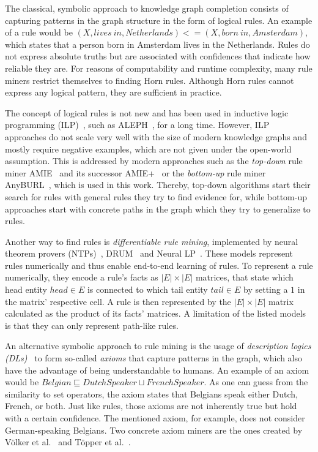 The classical, symbolic approach to knowledge graph completion consists of capturing patterns in the graph structure in the form of logical rules. An example of a rule would be $(X, lives~in, Netherlands) <= (X, born~in, Amsterdam)$, which states that a person born in Amsterdam lives in the Netherlands. Rules do not express absolute truths but are associated with confidences that indicate how reliable they are. For reasons of computability and runtime complexity, many rule miners restrict themselves to finding Horn rules. Although Horn rules cannot express any logical pattern, they are sufficient in practice.

The concept of logical rules is not new and has been used in inductive logic programming (ILP)~\cite{Muggleton1994InductiveLP}, such as ALEPH~\cite{ALEPH}, for a long time. However, ILP approaches do not scale very well with the size of modern knowledge graphs and mostly require negative examples, which are not given under the open-world assumption. This is addressed by modern approaches such as the \emph{top-down} rule miner AMIE~\cite{Galrraga2013AMIEAR} and its successor AMIE+~\cite{Galrraga2015FastRM} or the \emph{bottom-up} rule miner AnyBURL~\cite{Meilicke2019AnytimeBR}, which is used in this work. Thereby, top-down algorithms start their search for rules with general rules they try to find evidence for, while bottom-up approaches start with concrete paths in the graph which they try to generalize to rules.

Another way to find rules is \emph{differentiable rule mining}, implemented by neural theorem provers (NTPs)~\cite{Rocktschel2017EndtoendDP}, DRUM~\cite{Sadeghian2019DRUMED} and Neural LP~\cite{Yang2017DifferentiableLO}. These models represent rules numerically and thus enable end-to-end learning of rules. To represent a rule numerically, they encode a rule's facts as $|E| \times |E|$ matrices, that state which head entity $head \in E$ is connected to which tail entity $tail \in E$ by setting a $1$ in the matrix' respective cell. A rule is then represented by the $|E| \times |E|$ matrix calculated as the product of its facts' matrices. A limitation of the listed models is that they can only represent path-like rules.

An alternative symbolic approach to rule mining is the usage of \emph{description logics (DLs)}~\cite{Baader2003TheDL} to form so-called \emph{axioms} that capture patterns in the graph, which also have the advantage of being understandable to humans. An example of an axiom would be $Belgian \sqsubseteq DutchSpeaker \sqcup FrenchSpeaker$. As one can guess from the similarity to set operators, the axiom states that Belgians speak either Dutch, French, or both. Just like rules, those axioms are not inherently true but hold with a certain confidence. The mentioned axiom, for example, does not consider German-speaking Belgians. Two concrete axiom miners are the ones created by Völker et al.~\cite{Vlker2015AutomaticAO} and Töpper et al.~\cite{Tpper2012DBpediaOE}.
